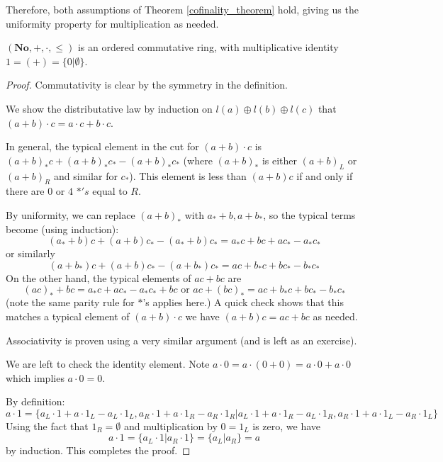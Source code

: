 Therefore, both assumptions of Theorem \ref{cofinality_theorem} hold, giving us the uniformity property for multiplication as needed.

\begin{proposition} %
 \end{proposition}

$(\mathbf{No},+,\cdot,\leq)$ is an ordered commutative ring, with multiplicative identity $1 = (+) = \{0 | \emptyset \}$.


\begin{proof}
Commutativity is clear by the symmetry in the definition.

We show the distributative law by induction on $l(a) \oplus l(b) \oplus l(c)$ that $(a+b)\cdot c = a\cdot c + b\cdot c$.

In general, the typical element in the cut for $(a+b)\cdot c$ is $(a+b)_* c + (a+b)_* c_* - (a+b)_*c_*$ (where $(a+b)_*$ is either $(a+b)_L$ or $(a+b)_R$ and similar for $c_*$). This element is less than $(a+b)c$ if and only if there are $0$ or $4$ $*'s$ equal to $R$.

By uniformity, we can replace $(a+b)_*$ with $a_*+b,a+b_*$, so the typical terms become (using induction):
\[
(a_*+b)c + (a+b)c_* - (a_*+b)c_* = a_*c + bc + ac_* - a_*c_*
\]
or similarly
\[
(a+b_*)c + (a+b)c_* - (a+b_*)c_* = ac + b_*c + bc_* - b_*c_*
\]
On the other hand, the typical elements of $ac + bc$ are
\[
(ac)_* + bc = a_*c + ac_* - a_*c_* + bc \text{ or } ac + (bc)_* = ac + b_*c + bc_* - b_*c_*
\]
(note the same parity rule for $*$'s applies here.) A quick check shows that this matches a typical element of $(a+b)\cdot c$ we have $(a+b)c = ac+bc$ as needed.

Associativity is proven using a very similar argument (and is left as an exercise).

We are left to check the identity element. Note $a\cdot 0 = a\cdot (0+0) = a\cdot 0 + a\cdot 0$ which implies $a\cdot 0 = 0$.

By definition:
\[
a\cdot 1 = \{a_L\cdot 1 + a\cdot 1_L - a_L\cdot 1_L, a_R\cdot 1 + a\cdot 1_R - a_R\cdot 1_R | a_L\cdot 1 + a \cdot 1_R - a_L\cdot 1_R, a_R \cdot 1 + a\cdot 1_L - a_R\cdot 1_L\}
\]
Using the fact that $1_R = \emptyset$ and multiplication by $0 = 1_L$ is zero, we have
\[
a\cdot 1 = \{a_L\cdot 1 | a_R \cdot 1\} = \{a_L | a_R\} = a
\]
by induction. This completes the proof.
\end{proof}

